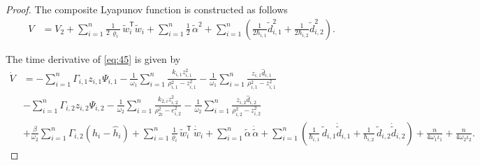 \documentclass[pdflatex,sn-mathphys-num]{sn-jnl}%
\theoremstyle{thmstyleone}%
\theoremstyle{thmstyletwo}%
\theoremstyle{thmstylethree}%
\begin{document}
\begin{proof}
The composite Lyapunov function is constructed as follows
\begin{equation}\label{eq:45}
	\begin{aligned}
		V & = V_2+ \sum_{i=1}^n \frac{1}{2\,\varrho_i}\,\tilde w_i^\mathsf{T}\tilde w_i+\sum_{i=1}^n \frac{1}{2}\,{\tilde{\alpha}}^2+\sum_{i=1}^n \left(\frac{1}{2\hbar_{i,1}}{\tilde d}^2_{i,1}+\frac{1}{2\hbar_{i,2}}{\tilde d}^2_{i,2}\right).
	\end{aligned}
\end{equation}

The time derivative of \cref{eq:45} is given by
\begin{equation}\label{eq:46}
	\begin{aligned}
		\dot{V}  & =- \sum_{i=1}^{n}\varGamma_{i,1}z_{i,1}\Psi_{i,1} - \frac{1}{\omega_{1}}\sum_{i=1}^{n}\frac{k_{i,1} z_{i,1}^2}{\rho_{i,1}^2 - z_{i,1}^2}- \frac{1}{\omega_{1}}\sum_{i=1}^{n} \frac{ z_{i,1}\hat d_{i,1}}{\rho_{i,1}^2 - z_{i,1}^2}\\
		& - \sum_{i=1}^{n}\varGamma_{i,2}z_{i,2}\Psi_{i,2}- \frac{1}{\omega_{2}}\sum_{i=1}^{n}\frac{ k_{2,i} z_{i,2}^2}{\rho_{2i}^2 - e_{i,2}^2} - \frac{1}{\omega_{2}}\sum_{i=1}^{n} \frac{ z_{i,2}\hat d_{i,2}}{\rho_{i,2}^2 - z_{i,2}^2}  \\
		& + \frac{\beta }{\omega_{2}}\sum_{i=1}^{n} \varGamma_{i,2} (h_{i}-\hat{h}_{i}) +\sum_{i=1}^n \frac{1}{\varrho_i}\,\tilde w_i^\mathsf{T}\,\dot{\tilde w}_i+\sum_{i=1}^{n}{{\tilde{\alpha}}}{}\,\dot {\tilde{\alpha}}+\sum_{i=1}^{n} \left(
			\frac{1}{\hbar_{i,1}}\,\tilde{d}_{i,1}\dot{\tilde{d}}_{i,1}
		  + \frac{1}{\hbar_{i,2}}\,\tilde{d}_{i,2}\dot{\tilde{d}}_{i,2}
	  \right)+ \frac{n}{4  \omega_{1} \iota_1 }  + \frac{n}{4  \omega_{2}\iota_2 } .
	\end{aligned}
\end{equation}



\end{proof}
\end{document}
